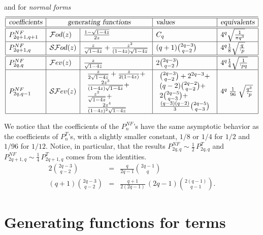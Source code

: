 \documentclass[preprint,authoryear]{elsarticle}
\newcommand{\Fev}{\mathcal{F}ev}
\newcommand{\Fod}{\mathcal{F}od}
\newcommand{\SFev}{\mathcal{SF}ev}
\newcommand{\SFod}{\mathcal{SF}od}
\begin{document}
and for \textit{normal forms}
\begin{displaymath}
\begin{array}{|l|l|l|l|l|}
\hline\hline
\textsl{coefficients}&\multicolumn{2}{c|}{\textsl{generating functions}}& \textsl{values} & \textsl{equivalents}\\
\hline\hline
P_{2q+1,q+1}^{NF} &  \Fod(z) & \frac{1-\sqrt{1-4z}}{2z} & C_q&4^q\sqrt{\frac{1}{\pi q^3}}\\
\hline
P_{2q+1,q}^{NF} &  \SFod(z) &  \frac{z}{\sqrt{1-4z}} + \frac{z^2}{(1-4z)\sqrt{1-4z}}& (q+1) {2q-3 \choose q-2} 
&4^q \frac{1}{8} \sqrt{\frac{q}{`p}}\\
\hline\hline
P_{2q,q}^{NF} &  \Fev(z) & \frac{z}{\sqrt{1-4z}} & 2{2q-3 \choose q-2} &4^q \frac{1}{4} \sqrt{\frac{1}{`p q}}\\
\hline
P_{2q,q-1}^{NF} & \SFev(z) &
\begin{array}{l}
\frac{z}{2\sqrt{1-4z}} + \frac{z}{2(1-4z)} +\\  \frac{2z^3 }{(1-4z)\sqrt{1-4z}} +\\
\frac{z^2}{\sqrt{1-4z}}+\\\frac{2z^4}{(1-4z)^2\sqrt{1-4z}}
\end{array} &
\begin{array}{l}
{2q-3 \choose q-2} + 2^{2q-3} + \\ (q-2){2q-2 \choose q-2} + \\
   2{2q-5 \choose q-3} + \\ \frac{(q-3)(q-2)}{3}{2q-5 \choose q-3}
\end{array} 
& 4^q\;\frac{1}{96}\;\sqrt{\frac{q^3}{`p}}\\
\hline
\end{array}
\end{displaymath}

We notice that the coefficients of the $P_n^{NF}$'s have the same asymptotic behavior as the
coefficients of $P_n^{T}$'s, with a slightly smaller constant, $1/8$ or $1/4$ for $1/2$
and $1/96$ for $1/12$.
Notice, in particular, that the results $P_{2q,q}^{NF} \sim \frac{1}{2}\, P_{2q,q}^{T}$
and $P_{2q+1,q}^{NF} \sim \frac{1}{4}\, P_{2q+1,q}^{T}$ comes from the identities.
\begin{eqnarray*}
  2{2q-3 \choose q-2} &=& \frac{q}{2q-1} {2q-1 \choose q}  \\
 (q+1) {2q-3 \choose q-2} &=& \frac{q+1}{2(2q-1)}\,(2q-1) {2(q-1)\choose q-1}.
\end{eqnarray*}

\section{Generating functions for terms}
\label{sec:gener-funct-terms}
\end{document}

